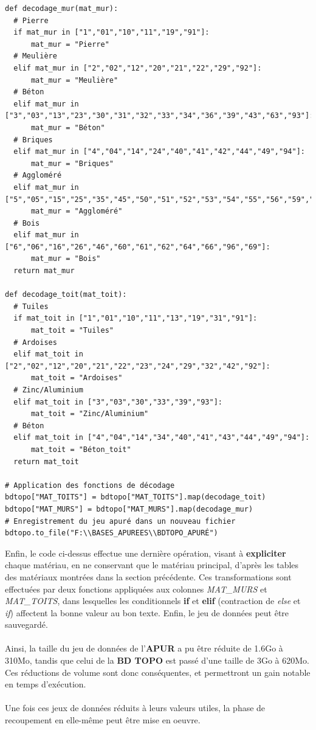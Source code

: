 \documentclass[
  11pt,
  french,
]{article}
\begin{document}
\begin{tcolorbox}[title= Décodage des notations des matériaux ,colback=boitecode]
\begin{lstlisting}[style=code]
def decodage_mur(mat_mur):
  # Pierre
  if mat_mur in ["1","01","10","11","19","91"]:
      mat_mur = "Pierre"
  # Meulière
  elif mat_mur in ["2","02","12","20","21","22","29","92"]:
      mat_mur = "Meulière"
  # Béton
  elif mat_mur in ["3","03","13","23","30","31","32","33","34","36","39","43","63","93"]:
      mat_mur = "Béton"
  # Briques
  elif mat_mur in ["4","04","14","24","40","41","42","44","49","94"]:
      mat_mur = "Briques"
  # Aggloméré
  elif mat_mur in ["5","05","15","25","35","45","50","51","52","53","54","55","56","59","65","95"]:
      mat_mur = "Aggloméré"
  # Bois
  elif mat_mur in ["6","06","16","26","46","60","61","62","64","66","96","69"]:
      mat_mur = "Bois"  
  return mat_mur

def decodage_toit(mat_toit):
  # Tuiles
  if mat_toit in ["1","01","10","11","13","19","31","91"]:
      mat_toit = "Tuiles"
  # Ardoises
  elif mat_toit in ["2","02","12","20","21","22","23","24","29","32","42","92"]:
      mat_toit = "Ardoises"
  # Zinc/Aluminium
  elif mat_toit in ["3","03","30","33","39","93"]:
      mat_toit = "Zinc/Aluminium"
  # Béton
  elif mat_toit in ["4","04","14","34","40","41","43","44","49","94"]:
      mat_toit = "Béton_toit"  
  return mat_toit

# Application des fonctions de décodage
bdtopo["MAT_TOITS"] = bdtopo["MAT_TOITS"].map(decodage_toit)
bdtopo["MAT_MURS"] = bdtopo["MAT_MURS"].map(decodage_mur)
# Enregistrement du jeu apuré dans un nouveau fichier
bdtopo.to_file("F:\\BASES_APUREES\\BDTOPO_APURÉ")\end{lstlisting}
\end{tcolorbox}

Enfin, le code ci-dessus effectue une dernière opération, visant à
\textbf{expliciter} chaque matériau, en ne conservant que le matériau
principal, d'après les tables des matériaux montrées dans la section
précédente. Ces transformations sont effectuées par deux fonctions
appliquées aux colonnes \emph{MAT\_MURS} et \emph{MAT\_TOITS}, dans
lesquelles les conditionnels \textbf{if} et \textbf{elif} (contraction
de \emph{else} et \emph{if}) affectent la bonne valeur au bon texte.
Enfin, le jeu de données peut être sauvegardé.\\
~\\
Ainsi, la taille du jeu de données de l'\textbf{APUR} a pu être réduite
de 1.6Go à 310Mo, tandis que celui de la \textbf{BD TOPO} est passé
d'une taille de 3Go à 620Mo. Ces réductions de volume sont donc
conséquentes, et permettront un gain notable en temps d'exécution.\\
~\\
Une fois ces jeux de données réduits à leurs valeurs utiles, la phase de
recoupement en elle-même peut être mise en oeuvre.
\end{document}
